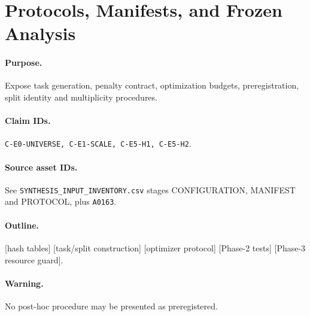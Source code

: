 \section{Protocols, Manifests, and Frozen Analysis}

\paragraph{Purpose.}
Expose task generation, penalty contract, optimization budgets,
preregistration, split identity and multiplicity procedures.

\paragraph{Claim IDs.}
\texttt{C-E0-UNIVERSE, C-E1-SCALE, C-E5-H1, C-E5-H2}.

\paragraph{Source asset IDs.}
See \texttt{SYNTHESIS\_INPUT\_INVENTORY.csv} stages CONFIGURATION, MANIFEST and PROTOCOL,
plus \texttt{A0163}.

\paragraph{Outline.}
[hash tables] [task/split construction] [optimizer protocol] [Phase-2 tests]
[Phase-3 resource guard].

\paragraph{Warning.}
No post-hoc procedure may be presented as preregistered.
